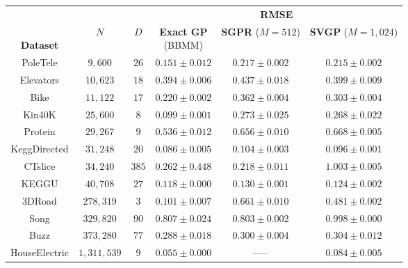 \begin{tabular}{ cccccc }
  \toprule
  &&&
	\multicolumn{3}{c}{{\bf RMSE}}  \\
  \cmidrule{4-6}
  \thead{\\{\bf Dataset}} & \thead{\\$N$} & \thead{\\$D$} &
  \thead{{\bf Exact GP} \\ (BBMM)} & \thead{{\bf SGPR} \\ ($M\!=\!512$)} & \thead{{\bf SVGP} \\ ($M\!=\!1,\!024$)}
  \\
  \midrule
	PoleTele             & $9,\!600$          & $26$  &   $\mathbf{0.151}\pm 0.012$  & $0.217\pm 0.002$          & $0.215\pm 0.002$  \\
	Elevators            & $10,\!623$         & $18$  &   $\mathbf{0.394}\pm 0.006$  & $0.437\pm 0.018$          & $0.399\pm 0.009$  \\
	Bike                 & $11,\!122$         & $17$  &   $\mathbf{0.220}\pm 0.002$  & $0.362\pm 0.004$          & $0.303\pm 0.004$  \\
	Kin40K               & $25,\!600$         & $8$   &   $\mathbf{0.099}\pm 0.001$  & $0.273\pm 0.025$          & $0.268\pm 0.022$  \\
	Protein              & $29,\!267$         & $9$   &   $\mathbf{0.536}\pm 0.012$  & $0.656\pm 0.010$          & $0.668\pm 0.005$  \\
	KeggDirected         & $31,\!248$         & $20$  &   $\mathbf{0.086}\pm 0.005$  & $0.104\pm 0.003$          & $0.096\pm 0.001$  \\
	CTslice              & $34,\!240$         & $385$ &   $0.262\pm 0.448$           & $\mathbf{0.218}\pm 0.011$ & $1.003\pm 0.005$  \\
	KEGGU                & $40,\!708$         & $27$  &   $\mathbf{0.118}\pm 0.000$  & $0.130\pm 0.001$          & $0.124\pm 0.002$  \\
	3DRoad               & $278,\!319$        & $3$   &   $\mathbf{0.101}\pm 0.007$  & $0.661\pm 0.010$          & $0.481\pm 0.002$  \\
	Song                 & $329,\!820$        & $90$  &   $0.807\pm 0.024$           & $\mathbf{0.803}\pm 0.002$ & $0.998\pm 0.000$  \\
  Buzz                 & $373,\!280$        & $77$  &   $\mathbf{0.288}\pm 0.018$  & $0.300\pm 0.004$          & $0.304\pm 0.012$  \\
	HouseElectric        & $1,\!311,\!539$    & $9$   &   $\mathbf{0.055}\pm 0.000$  & -----                     & $0.084\pm 0.005$  \\
  \bottomrule
\end{tabular}
